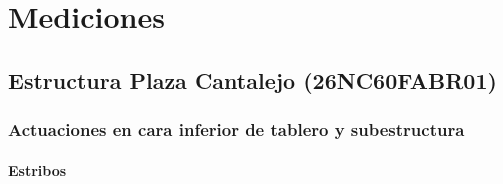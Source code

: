 \documentclass{book}%
\begin{document}
%
\normalsize%
\doparttoc%
\part{Mediciones}%
\chapter{Estructura Plaza Cantalejo (26NC60FABR01)}%
\section{Actuaciones en cara inferior de tablero y subestructura}%
\subsection{Estribos}%
\tablefirsthead{}%
\tablehead{}%
%
\tablelasttail{}%
\end{document}
